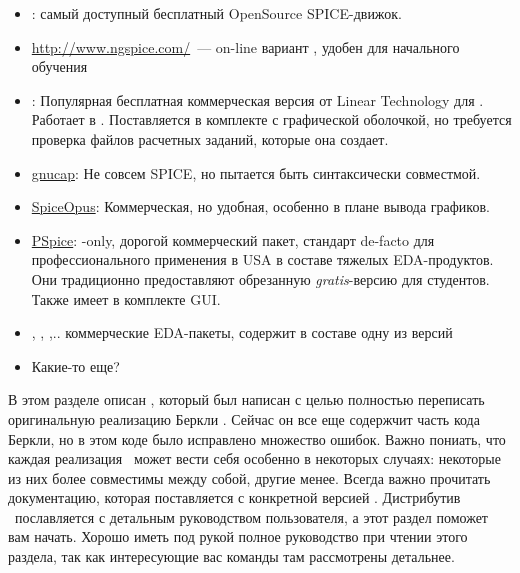 \begin{itemize}
\item \href{http://ngspice.sourceforge.net/}{\ngs}: самый доступный
бесплатный OpenSource SPICE-движок.
\item \url{http://www.ngspice.com/}\ --- on-line вариант , удобен
для начального обучения
\item \href{http://www.linear.com/designtools/software/}{\lts}:
Популярная бесплатная коммерческая версия от Linear Technology для \win.
Работает в . Поставляется в комплекте с графической оболочкой,
но требуется проверка файлов расчетных заданий, которые она создает.
\item 
\href{https://www.gnu.org/software/gnucap/}{gnucap}:
Не совсем SPICE, но пытается быть синтаксически совместмой.
\item \href{http://www.spiceopus.si/}{SpiceOpus}: Коммерческая, но
удобная, особенно в плане вывода графиков.
\item
\href{http://www.cadence.com/products/orcad/pspice_simulation/Pages/default.aspx}{PSpice}:
\win-only, дорогой коммерческий пакет, стандарт de-facto для
профессионального применения в USA в составе тяжелых EDA-продуктов.
Они традиционно предоставляют обрезанную \emph{gratis}-версию для студентов.
Также имеет в комплекте GUI.
\item {}, , ,.. коммерческие
EDA-пакеты, содержит в составе одну из версий 
\item Какие-то еще?
\end{itemize}

В этом разделе описан \ngs, который был написан с целью полностью переписать
оригинальную реализацию Беркли \spice. Сейчас он все еще содержчит часть кода
Беркли, но в этом коде было исправлено множество ошибок.
Важно пониать, что каждая реализация \spice\ может вести себя особенно в
некоторых случаях: некоторые из них более совместимы между собой, другие менее.
Всегда важно прочитать документацию, которая поставляется с конкретной
версией \spice. Дистрибутив \ngs\ пославляется с детальным руководством
пользователя, а этот раздел поможет вам начать. Хорошо иметь под рукой полное
руководство при чтении этого раздела, так как интересующие вас команды там
рассмотрены детальнее.



